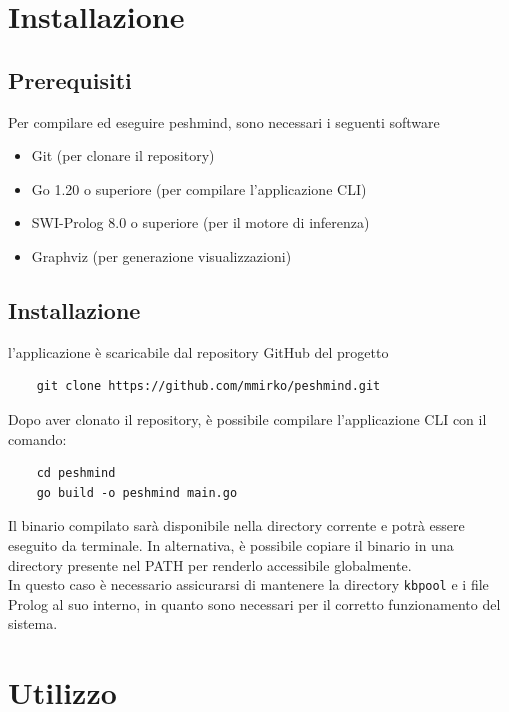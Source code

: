 \documentclass[12pt,a4paper]{article}
\begin{document}
\section{Installazione}
\subsection{Prerequisiti}

Per compilare ed eseguire peshmind, sono necessari i seguenti software

\begin{itemize}
    \item Git (per clonare il repository)
    \item Go 1.20 o superiore (per compilare l'applicazione CLI)
    \item SWI-Prolog 8.0 o superiore (per il motore di inferenza)
    \item Graphviz (per generazione visualizzazioni)
\end{itemize}

\subsection{Installazione}

l'applicazione è scaricabile dal repository GitHub del progetto \\

\begin{lstlisting} 
    git clone https://github.com/mmirko/peshmind.git
\end{lstlisting}

Dopo aver clonato il repository, è possibile compilare l'applicazione CLI con il comando: \\
\begin{lstlisting}
    cd peshmind
    go build -o peshmind main.go
\end{lstlisting}

Il binario compilato sarà disponibile nella directory corrente e potrà essere eseguito da terminale.
In alternativa, è possibile copiare il binario in una directory presente nel PATH per renderlo accessibile globalmente. \\

In questo caso è necessario assicurarsi di mantenere la directory \texttt{kbpool} e i file Prolog al suo interno, in quanto
sono necessari per il corretto funzionamento del sistema.

\section{Utilizzo}
\end{document}
